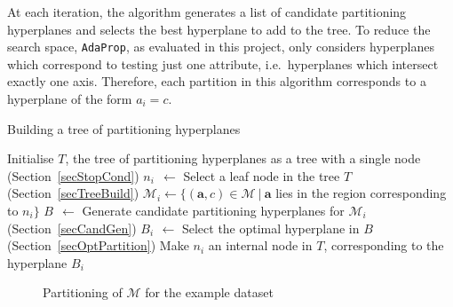 \documentclass[a4paper,12pt]{article} %
\newcommand{\AdaProp}{\texttt{AdaProp}\xspace}
\newcommand{\mcl}[1]{\mathcal{#1}}
\newcommand{\vect}[1]{\boldsymbol{#1}}
\begin{document}
At each iteration,
    the algorithm generates a list of candidate partitioning hyperplanes and
    selects the best hyperplane to add to the tree.
To reduce the search space,
    \AdaProp, as evaluated in this project,
     only considers hyperplanes which
    correspond to testing just one attribute, 
    i.e.\ hyperplanes which intersect exactly one axis.
Therefore, each partition in this algorithm
    corresponds to a hyperplane of the form $a_i = c$.

\begin{algorithm}
\caption{Building a tree of partitioning hyperplanes}
\label{algoTree} 
\begin{algorithmic}
\State Initialise $T$, the tree of partitioning hyperplanes as a tree with a single node
 \hfill (Section~\ref{secStopCond})
    \State $n_i ~~\gets$ Select a leaf node in the tree $T$ \hfill (Section~\ref{secTreeBuild})
    \State $\mcl{M}_i \gets \{ (\vect{a},c) \in \mcl{M} ~|~ \vect{a}$ 
        lies in the region corresponding to $n_i \}$
    \State $B ~~\gets$ Generate candidate partitioning hyperplanes for 
        $\mcl{M}_i$ \hfill (Section~\ref{secCandGen})
    \State $B_i \,~\gets$ Select the optimal hyperplane in $B$ \hfill (Section~\ref{secOptPartition})
    \State Make $n_i$ an internal node in $T$, corresponding 
        to the hyperplane $B_i$
\EndWhile
\end{algorithmic}
\end{algorithm}

\begin{figure}
\begin{center}
\end{center}
\caption{Partitioning of $\mcl{M}$ for the example dataset}
\label{visMpart}
\end{figure}
\end{document}
